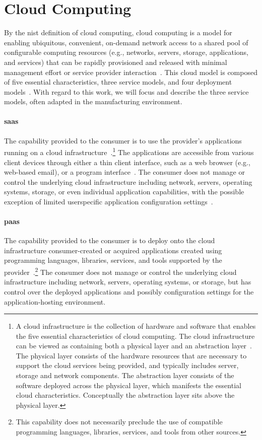 \documentclass[
a4paper,
twoside,
headsepline,
cleardoublepage=empty,
parskip=half,
draft=false
]{scrbook}
\begin{document}
		\section{Cloud Computing}\label{sec:cloud_computing}

			By the \gls{nist} definition of cloud computing, cloud computing is a model for enabling ubiquitous, convenient, on-demand network access to a shared pool of configurable computing resources (e.g., networks, servers, storage, applications, and services) that can be rapidly provisioned and released with minimal management effort or service provider interaction~\cite{mell2011nist}.
			This cloud model is composed of five essential characteristics, three service models, and four deployment
			models~\cite{fehling2014cloud}. With regard to this work, we will focus and describe the three service models, often adapted in the manufacturing environment.

			\paragraph{\gls{saas}} The capability provided to the consumer is to use the provider's applications running on a cloud infrastructure~\cite{mell2011nist}.\footnote{A cloud infrastructure is the collection of hardware and software that enables the five essential characteristics of cloud computing. The cloud infrastructure can be viewed as containing both a physical layer and an abstraction layer~\cite{fehling2014cloud}. The physical layer consists of the hardware resources that are necessary to support the cloud services being provided, and typically includes server, storage and network components. The abstraction layer consists of the software deployed across the physical layer, which manifests the essential cloud characteristics. Conceptually the abstraction layer sits above the physical layer.}
			The applications are accessible from various client devices through either a thin client interface, such as a web browser (e.g., web-based email), or a program interface~\cite{mell2011nist}.
			The consumer does not manage or control the underlying cloud infrastructure including network, servers, operating systems, storage, or even individual application capabilities, with the possible exception of limited userspecific application configuration settings~\cite{mell2011nist}.

			\paragraph{\gls{paas}} The capability provided to the consumer is to deploy onto the cloud infrastructure consumer-created or acquired applications created using programming languages, libraries, services, and tools supported by the provider~\cite{fehling2014cloud}.\footnote{This capability does not necessarily preclude the use of compatible programming languages, libraries, services, and tools from other sources.}
			The consumer does not manage or control the underlying cloud infrastructure including network, servers, operating systems, or storage, but has control over the deployed applications and possibly configuration settings for the application-hosting environment.
\end{document}
